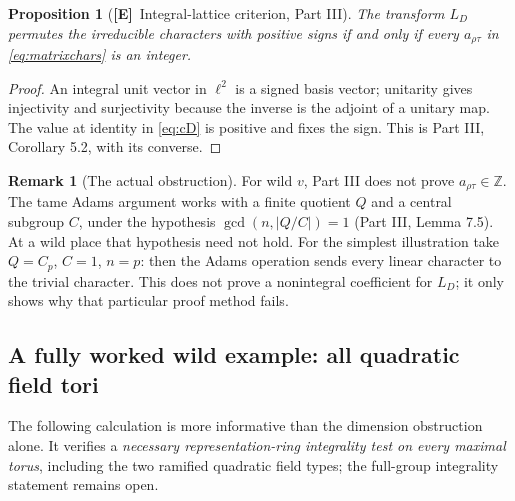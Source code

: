 \documentclass[11pt]{article}
\newcommand{\Z}{\mathbb Z}
\newcommand{\Etag}{\textnormal{\textbf{[E]}}}
\theoremstyle{plain}
\newtheorem{proposition}[theorem]{Proposition}
\theoremstyle{definition}
\newtheorem{remark}[theorem]{Remark}
\begin{document}
\begin{proposition}[\Etag\ Integral-lattice criterion, Part III]\label{prop:int}
The transform $L_D$ permutes the irreducible characters with
positive signs if and only if every $a_{\rho\tau}$ in
\eqref{eq:matrixchars} is an integer.
\end{proposition}
\begin{proof}
An integral unit vector in $\ell^2$ is a signed basis vector;
unitarity gives injectivity and surjectivity because the inverse
is the adjoint of a unitary map.  The value at identity in
\eqref{eq:cD} is positive and fixes the sign.
This is Part III, Corollary 5.2, with its converse.
\end{proof}

\begin{remark}[The actual obstruction]
For wild $v$, Part III does not prove
$a_{\rho\tau}\in\Z$.  The tame Adams argument works with a
finite quotient $Q$ and a central subgroup $C$, under the
hypothesis $\gcd(n,|Q/C|)=1$ (Part III, Lemma 7.5).
At a wild place that hypothesis need not hold.  For the
simplest illustration take $Q=C_p$, $C=1$, $n=p$: then the
Adams operation sends every linear character to the trivial
character.  This does not prove a nonintegral coefficient for
$L_D$; it only shows why that particular proof method fails.
\end{remark}

\subsection{A fully worked wild example: all quadratic field tori}
\label{subsec:examplewild}
The following calculation is more informative than the dimension
obstruction alone.  It verifies a \emph{necessary representation-ring
integrality test on every maximal torus}, including the two ramified
quadratic field types; the full-group integrality statement remains open.
\end{document}
